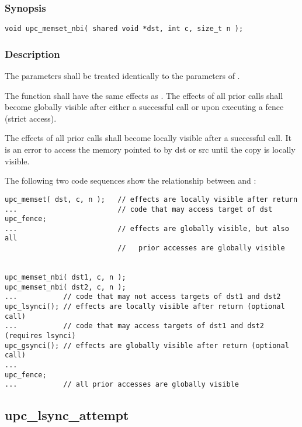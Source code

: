 \subsubsection{Synopsis}

\begin{verbatim}
void upc_memset_nbi( shared void *dst, int c, size_t n );
\end{verbatim}

\subsubsection{Description}

\npf The parameters shall be treated identically to the parameters of
\memset{}.

\np The \function{} function shall have the same effects as \memset{}.
The effects of all prior \function{} calls shall become globally visible after 
either a successful \gsynci{} call or upon executing a fence (strict access).

\np The effects of all prior \function{} calls shall become locally 
visible after a successful \lsynci{} call.  It is an error to access the memory
pointed to by dst or src until the copy is locally visible.

\np The following two code sequences show the relationship between
\memset{} and \function{}:

\begin{verbatim} 
upc_memset( dst, c, n );   // effects are locally visible after return
...                        // code that may access target of dst
upc_fence;                 
...                        // effects are globally visible, but also all
                           //   prior accesses are globally visible


upc_memset_nbi( dst1, c, n );
upc_memset_nbi( dst2, c, n );
...           // code that may not access targets of dst1 and dst2
upc_lsynci(); // effects are locally visible after return (optional call)
...           // code that may access targets of dst1 and dst2 (requires lsynci)
upc_gsynci(); // effects are globally visible after return (optional call)
...
upc_fence;
...           // all prior accesses are globally visible
\end{verbatim}

\newpage
\subsection{upc\_lsync\_attempt}
\def\function{{\tt upc\_lsync\_attempt}}

